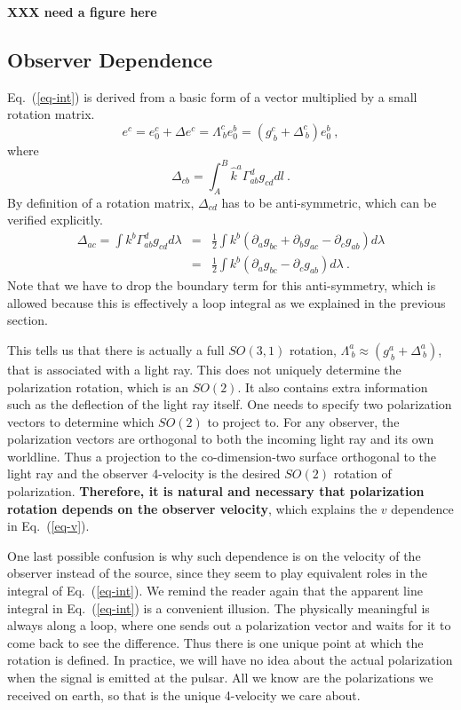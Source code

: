 \documentclass[aps,showpacs,onecolumn,floats,prd,superscriptaddress,nofootinbib]{revtex4}
\begin{document}
{\bf XXX need a figure here}

\subsection{Observer Dependence}

Eq.~(\ref{eq-int}) is derived from a basic form of a vector multiplied by a small rotation matrix.
\begin{equation}
e^c = e_0^c + \Delta e^c = \Lambda^c_{\ b} e_0^b = 
\left( g^c_{\ b} + \Delta^c_{\ b} \right) e_0^b~,
\end{equation}
where
\begin{equation}
\Delta_{cb} = \int_A^B \hat{k}^a \Gamma^d_{ab} g_{cd}dl~.
\end{equation}
By definition of a rotation matrix, $\Delta_{cd}$ has to be anti-symmetric, which can be verified explicitly.
\begin{eqnarray}
\Delta_{ac} = \int k^b\Gamma_{ab}^d g_{cd}d\lambda &=& 
\frac{1}{2} \int k^b \left(\partial_a g_{bc} + \partial_bg_{ac} - \partial_c g_{ab}\right)d\lambda
\label{eq-Delta}
\\ \nonumber
&=& \frac{1}{2} \int k^b \left(\partial_a g_{bc} - \partial_c g_{ab}\right)d\lambda~.
\end{eqnarray}
Note that we have to drop the boundary term for this anti-symmetry, which is allowed because this is effectively a loop integral as we explained in the previous section.

This tells us that there is actually a full $SO(3,1)$ rotation, $\Lambda^a_{\ b}\approx\left(g^a_{\ b} + \Delta^a_{\ b}\right)$, that is associated with a light ray. 
This does not uniquely determine the polarization rotation, which is an $SO(2)$. 
It also contains extra information such as the deflection of the light ray itself. 
One needs to specify two polarization vectors to determine which $SO(2)$ to project to. 
For any observer, the polarization vectors are orthogonal to both the incoming light ray and its own worldline. 
Thus a projection to the co-dimension-two surface orthogonal to the light ray and the observer 4-velocity is the desired $SO(2)$ rotation of polarization. 
{\bf Therefore, it is natural and necessary that polarization rotation depends on the observer velocity}, which explains the $v$ dependence in Eq.~(\ref{eq-v}).

One last possible confusion is why such dependence is on the velocity of the observer instead of the source, since they seem to play equivalent roles in the integral of Eq.~(\ref{eq-int}). 
We remind the reader again that the apparent line integral in Eq.~(\ref{eq-int}) is a convenient illusion. 
The physically meaningful is always along a loop, where one sends out a polarization vector and waits for it to come back to see the difference. 
Thus there is one unique point at which the rotation is defined. 
In practice, we will have no idea about the actual polarization when the signal is emitted at the pulsar. 
All we know are the polarizations we received on earth, so that is the unique 4-velocity we care about.
\end{document}
